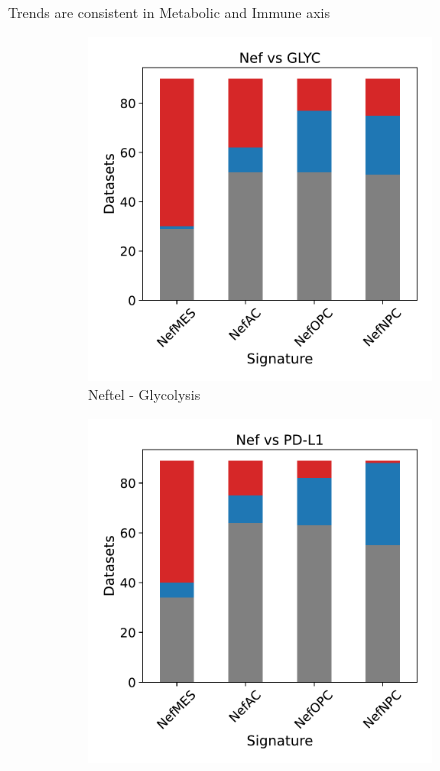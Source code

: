 \documentclass[aspectratio=169,9pt]{beamer}
\begin{document}
    \begin{frame}{Trends are consistent in Metabolic and Immune axis}
        \begin{adjustwidth}{-5cm}{-5cm}
            \centering
            \begin{figure}
                \centering
                \begin{subfigure}[c]{0.27\textwidth}
                    \centering
                    \includegraphics[width=\textwidth]{Bar_Bulk_Nef-GLYC}
                    \caption{Neftel - Glycolysis}
                \end{subfigure}
                \begin{subfigure}[c]{0.27\textwidth}
                    \centering
                    \includegraphics[width=\textwidth]{Bar_Bulk_Nef-PD-L1}

\end{subfigure}
\end{figure}
\end{adjustwidth}
\end{frame}
\end{document}

